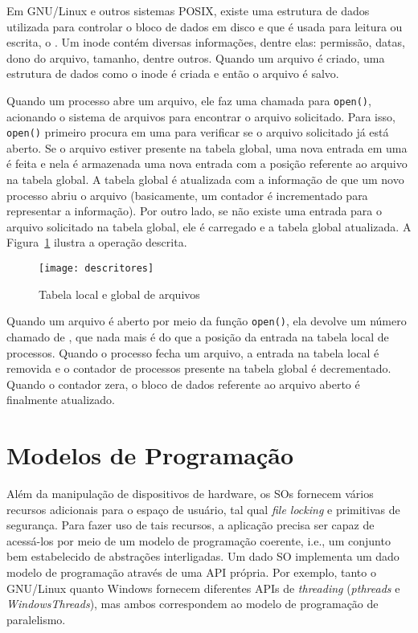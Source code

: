 Em GNU/Linux e outros sistemas POSIX, existe uma estrutura de dados utilizada
para controlar o bloco de dados em disco e que é usada para leitura ou escrita,
o . Um inode contém diversas informações, dentre elas:
permissão, datas, dono do arquivo, tamanho, dentre outros. Quando um arquivo é
criado, uma estrutura de dados como o inode é criada e então o arquivo é salvo.

Quando um processo abre um arquivo, ele faz uma chamada para \texttt{open()},
acionando o sistema de arquivos para encontrar o arquivo solicitado.
Para isso, \texttt{open()} primeiro procura em uma  para verificar se o arquivo solicitado já está aberto. Se o
arquivo estiver presente na tabela global, uma nova entrada em uma
 é feita e nela é
armazenada uma nova entrada com a posição referente ao arquivo na tabela
global. A tabela global é atualizada com a informação de que um novo processo
abriu o arquivo (basicamente, um contador é incrementado para representar a
informação). Por outro lado, se não existe uma entrada para o arquivo solicitado
na tabela global, ele é carregado e a tabela global atualizada. A
Figura~\ref{fig:descritores} ilustra a operação descrita.
 
\begin{figure}[!h]
  \centering
  \texttt{[image: descritores]} 
  \caption{Tabela local e global de arquivos}
  \label{fig:descritores} 
\end{figure}

Quando um arquivo é aberto por meio da função \texttt{open()}, ela devolve um
número chamado de ,
que nada mais é do que a posição da entrada na tabela local de processos.
Quando o processo fecha um arquivo, a entrada na tabela local é removida e o
contador de processos presente na tabela global é decrementado. Quando o
contador zera, o bloco de dados referente ao arquivo aberto é finalmente
atualizado.

\section{Modelos de Programação}

Além da manipulação de dispositivos de hardware, os SOs fornecem vários
recursos adicionais para o espaço de usuário, tal qual \emph{file locking} e
primitivas de segurança. Para fazer uso de tais recursos, a aplicação precisa
ser capaz de acessá-los por meio de um modelo de programação coerente, i.e., um
conjunto bem estabelecido de abstrações interligadas. Um dado SO implementa um
dado modelo de programação através de uma API própria. Por exemplo, tanto o
GNU/Linux quanto Windows fornecem diferentes APIs de \emph{threading}
(\emph{pthreads} e \emph{WindowsThreads}), mas ambos correspondem ao modelo de
programação de paralelismo.

